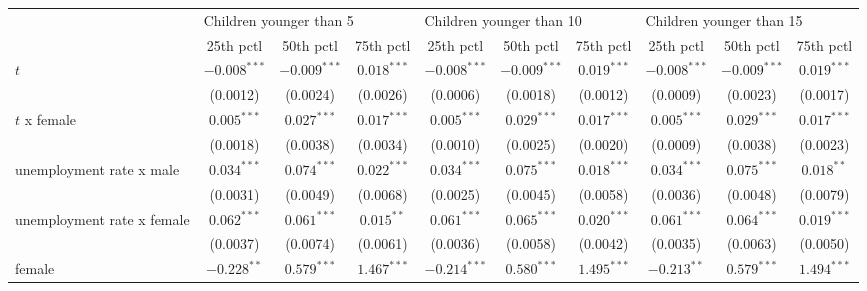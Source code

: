 \begin{tabular}{l|ccc|ccc|ccc|}
\toprule
{} & \multicolumn{3}{l}{Children younger than 5} & \multicolumn{3}{l}{Children younger than 10} & \multicolumn{3}{l}{Children younger than 15} \\
{} &               25th pctl &       50th pctl &       75th pctl &                25th pctl &       50th pctl &       75th pctl &                25th pctl &       50th pctl &       75th pctl \\
\midrule
$t$                        &          $-0.008^{***}$ &  $-0.009^{***}$ &   $0.018^{***}$ &           $-0.008^{***}$ &  $-0.009^{***}$ &   $0.019^{***}$ &           $-0.008^{***}$ &  $-0.009^{***}$ &   $0.019^{***}$ \\
                           &                (0.0012) &        (0.0024) &        (0.0026) &                 (0.0006) &        (0.0018) &        (0.0012) &                 (0.0009) &        (0.0023) &        (0.0017) \\
$t$ x female               &           $0.005^{***}$ &   $0.027^{***}$ &   $0.017^{***}$ &            $0.005^{***}$ &   $0.029^{***}$ &   $0.017^{***}$ &            $0.005^{***}$ &   $0.029^{***}$ &   $0.017^{***}$ \\
                           &                (0.0018) &        (0.0038) &        (0.0034) &                 (0.0010) &        (0.0025) &        (0.0020) &                 (0.0009) &        (0.0038) &        (0.0023) \\
unemployment rate x male   &           $0.034^{***}$ &   $0.074^{***}$ &   $0.022^{***}$ &            $0.034^{***}$ &   $0.075^{***}$ &   $0.018^{***}$ &            $0.034^{***}$ &   $0.075^{***}$ &    $0.018^{**}$ \\
                           &                (0.0031) &        (0.0049) &        (0.0068) &                 (0.0025) &        (0.0045) &        (0.0058) &                 (0.0036) &        (0.0048) &        (0.0079) \\
unemployment rate x female &           $0.062^{***}$ &   $0.061^{***}$ &    $0.015^{**}$ &            $0.061^{***}$ &   $0.065^{***}$ &   $0.020^{***}$ &            $0.061^{***}$ &   $0.064^{***}$ &   $0.019^{***}$ \\
                           &                (0.0037) &        (0.0074) &        (0.0061) &                 (0.0036) &        (0.0058) &        (0.0042) &                 (0.0035) &        (0.0063) &        (0.0050) \\
female                     &           $-0.228^{**}$ &   $0.579^{***}$ &   $1.467^{***}$ &           $-0.214^{***}$ &   $0.580^{***}$ &   $1.495^{***}$ &            $-0.213^{**}$ &   $0.579^{***}$ &   $1.494^{***}$ \\

\end{tabular}
